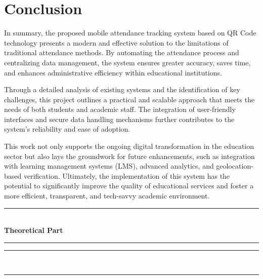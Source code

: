 \documentclass[12pt,a4paper]{report}
\begin{document}
\section{Conclusion}
In summary, the proposed mobile attendance tracking system based on QR Code technology presents a modern and effective solution to the limitations of traditional attendance methods. By automating the attendance process and centralizing data management, the system ensures greater accuracy, saves time, and enhances administrative efficiency within educational institutions. 

Through a detailed analysis of existing systems and the identification of key challenges, this project outlines a practical and scalable approach that meets the needs of both students and academic staff. The integration of user-friendly interfaces and secure data handling mechanisms further contributes to the system's reliability and ease of adoption.

This work not only supports the ongoing digital transformation in the education sector but also lays the groundwork for future enhancements, such as integration with learning management systems (LMS), advanced analytics, and geolocation-based verification. Ultimately, the implementation of this system has the potential to significantly improve the quality of educational services and foster a more efficient, transparent, and tech-savvy academic environment.



\newpage
\thispagestyle{empty}

\setcounter{chapter}{1} %

{}

\vspace*{\fill}
\begin{center}
    {\color{mintgreen} \rule{\textwidth}{2pt} }\\[0.5cm]
    {\Huge \textbf{Theoretical Part}}\\[0.5cm]
    {\color{mintgreen} \rule{0.8\textwidth}{1.5pt} }
\end{center}
\vspace*{\fill}

\begin{center}
    {\color{mintgreen} \rule{0.8\textwidth}{1.5pt} }\\[0.3cm]
    {\color{mintgreen} \rule{\textwidth}{2pt} }
\end{center}
\end{document}
